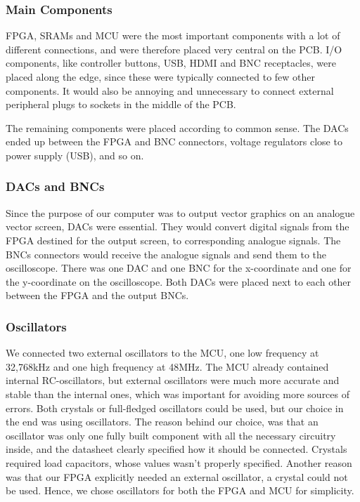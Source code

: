 \subsubsection{Main Components}
FPGA, SRAMs and MCU were the most important components with a lot of different connections, and were therefore placed very central on the PCB.
I/O components, like controller buttons, USB, HDMI and BNC receptacles, were placed along the edge, since these were typically connected to few other components.
It would also be annoying and unnecessary to connect external peripheral plugs to sockets in the middle of the PCB.

The remaining components were placed according to common sense.
The DACs ended up between the FPGA and BNC connectors, voltage regulators close to power supply (USB), and so on.

\subsubsection{DACs and BNCs}
Since the purpose of our computer was to output vector graphics on an analogue vector screen, DACs were essential.
They would convert digital signals from the FPGA destined for the output screen, to corresponding analogue signals.
The BNCs connectors would receive the analogue signals and send them to the oscilloscope.
There was one DAC and one BNC for the x-coordinate and one for the y-coordinate on the oscilloscope.
Both DACs were placed next to each other between the FPGA and the output BNCs.

\subsubsection{Oscillators}
We connected two external oscillators to the MCU, one low frequency at 32,768kHz and one high frequency at 48MHz.
The MCU already contained internal RC-oscillators, but external oscillators were much more accurate and stable than the internal ones, which was important for avoiding more sources of errors.
Both crystals or full-fledged oscillators could be used, but our choice in the end was using oscillators.
The reason behind our choice, was that an oscillator was only one fully built component with all the necessary circuitry inside, and the datasheet clearly specified how it should be connected.
Crystals required load capacitors, whose values wasn't properly specified.
Another reason was that our FPGA explicitly needed an external oscillator, a crystal could not be used.
Hence, we chose oscillators for both the FPGA and MCU for simplicity.

